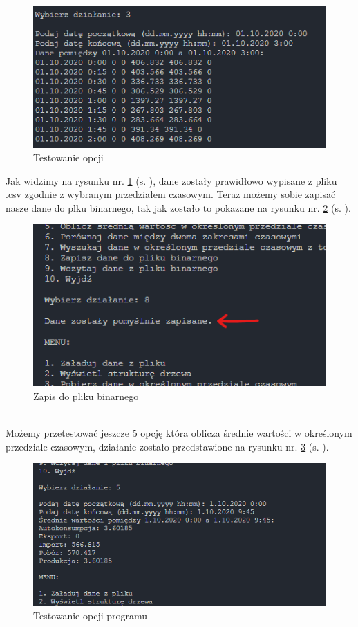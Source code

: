 \begin{figure}[h]
    \centering
    \includegraphics[width=0.8\linewidth]{img/4.png}
    \caption{Testowanie opcji}
    \label{rys:rysunek3}
\end{figure}
\newpage
\noindent Jak widzimy na rysunku nr. \ref{rys:rysunek3} (s. \pageref{rys:rysunek3}), dane zostały prawidłowo wypisane z pliku .csv zgodnie z wybranym przedziałem czasowym. Teraz możemy sobie zapisać nasze dane do plku binarnego, tak jak zostało to pokazane na rysunku nr.  \ref{rys:rysunek5} (s. \pageref{rys:rysunek5}).
\begin{figure}[h]
    \centering
    \includegraphics[width=0.8\linewidth]{img/5.png}
    \caption{Zapis do pliku binarnego}
    \label{rys:rysunek5}
\end{figure} \\
Możemy przetestować jeszcze 5 opcję która oblicza średnie wartości w określonym przedziale czasowym, działanie zostało przedstawione na rysunku nr. \ref{rys:rysunek6} (s. \pageref{rys:rysunek6}).
\begin{figure}[h]
    \centering
    \includegraphics[width=0.8\linewidth]{img/6.png}
    \caption{Testowanie opcji programu}
    \label{rys:rysunek6}
\end{figure}
\newpage
